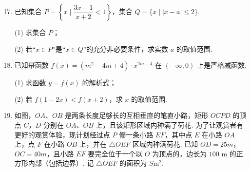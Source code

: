 \documentclass[a4paper,11pt]{article}
\begin{document}
\begin{enumerate}
\setcounter{enumi}{16}

\item 已知集合 $P=\left\{x\mid \dfrac{3x-1}{x+2}<1\right\}$，集合 $Q=\{x\mid\lvert x-a\rvert\leq2\}$.

(1) 求集合 $P$；

(2) 若“$x\in P$”是“$x\in Q$”的充分非必要条件，求实数 $a$ 的取值范围.

\ifanswer
\solbegin
{}
\solend
\fi

\item 已知幂函数 $f(x)=(m^2-4m+4)\cdot x^{2m-4}$ 在 $(-\infty,0)$ 上是严格减函数.

(1) 求函数 $y=f(x)$ 的解析式；

(2) 若 $f(1-2x)<f(x+2)$，求 $x$ 的取值范围.

\ifanswer
\solbegin
{}
\step{(2) 由函数 $f(x)=x^2$ 图象关于 $y$ 轴对称，且在 $[0,+\infty)$ 上严格增，}
\solend
\fi

\needvspace{7cm}
\item 如图，$OA$、$OB$ 是两条长度足够长的互相垂直的笔直小路，矩形 $OCPD$ 的顶点 $C$，$D$ 分别在 $OA$、$OB$ 上，且该矩形区域内种满了荷花. 为了让观赏者有更好的观赏体验，现计划经过点 $P$ 修一条小路 $EF$，其中点 $E$ 在小路 $OA$ 上，点 $F$ 在小路 $OB$ 上，并在 $\triangle OEF$ 区域内种满荷花. 已知 $OD=25m$，$OC=40m$，且小路 $EF$ 要完全位于一个以 $O$ 为顶点的，边长为 $100$ m 的正方形内部（包括边界）. 记 $\triangle OEF$ 的面积为 $S$m$^2$.


\end{enumerate}
\end{document}
